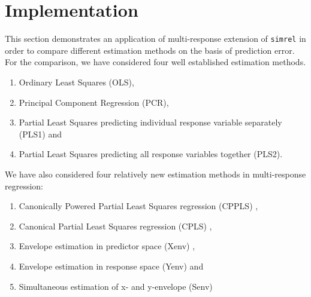 \documentclass[review]{elsarticle}
\providecommand{\tightlist}{%
  \setlength{\itemsep}{0pt}\setlength{\parskip}{0pt}}
\theoremstyle{definition}
\theoremstyle{definition}
\theoremstyle{remark}
\begin{document}
\hypertarget{implementation}{\section{Implementation}\label{implementation}}

This section demonstrates an application of multi-response extension of
\texttt{simrel} in order to compare different estimation methods on the
basis of prediction error. For the comparison, we have considered four
well established estimation methods.

\begin{enumerate}
\def\labelenumi{\alph{enumi})}
\tightlist
\item
  Ordinary Least Squares (OLS),
\item
  Principal Component Regression (PCR),
\item
  Partial Least Squares predicting individual response variable
  separately (PLS1) and
\item
  Partial Least Squares predicting all response variables together
  (PLS2).
\end{enumerate}

We have also considered four relatively new estimation methods in
multi-response regression:

\begin{enumerate}
\def\labelenumi{\alph{enumi})}
\tightlist
\item
  Canonically Powered Partial Least Squares regression (CPPLS)
  \citep{indahl2009canonical},
\item
  Canonical Partial Least Squares regression (CPLS)
  \citep{indahl2009canonical},
\item
  Envelope estimation in predictor space (Xenv)
  \citep{cook2010envelope},
\item
  Envelope estimation in response space (Yenv)
  \citep{cook2015foundations} and
\item
  Simultaneous estimation of x- and y-envelope (Senv)
  \citep{cook2015simultaneous}
\end{enumerate}
\end{document}
